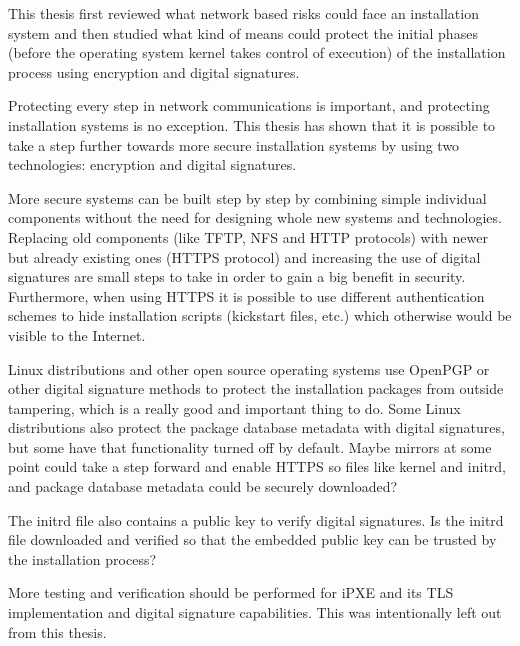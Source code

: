 
\iffalse
\begin{itemize}
\item FIXME: remove this list
\item CONCLUSIONS: reference to purpose of study
\item CONCLUSIONS: value of / reasons for the study
\item CONCLUSIONS: review of important findings / conclusions
\item CONCLUSIONS: comments, explanations or speculations about findings
\item CONCLUSIONS: limitations of study
\item CONCLUSIONS: implications of study or generalizations
\item CONCLUSIONS: recommendations for future or practical applications - USUALLY SKIPPED
\end{itemize}
\fi

This thesis first reviewed what network based risks could face an
installation system and then studied what kind of means could protect
the initial phases (before the operating system kernel takes control
of execution) of the installation process using encryption and digital
signatures.

Protecting every step in network communications is important, and
protecting installation systems is no exception. This thesis has shown
that it is possible to take a step further towards more secure
installation systems by using two technologies: encryption and digital
signatures.

More secure systems can be built step by step by combining simple
individual components without the need for designing whole new systems
and technologies. Replacing old components (like TFTP, NFS and HTTP
protocols) with newer but already existing ones (HTTPS protocol) and
increasing the use of digital signatures are small steps to take in
order to gain a big benefit in security. Furthermore, when using HTTPS
it is possible to use different authentication schemes to hide
installation scripts (kickstart files, etc.) which otherwise would be
visible to the Internet.

Linux distributions and other open source operating systems use
OpenPGP or other digital signature methods to protect the installation
packages from outside tampering, which is a really good and important
thing to do. Some Linux distributions also protect the package
database metadata with digital signatures, but some have that
functionality turned off by default. Maybe mirrors at some point could
take a step forward and enable HTTPS so files like kernel and initrd,
and package database metadata could be securely downloaded?

The initrd file also contains a public key to verify digital
signatures. Is the initrd file downloaded and verified so that the
embedded public key can be trusted by the installation process?

More testing and verification should be performed for iPXE and
its TLS implementation and digital signature capabilities. This was
intentionally left out from this thesis.
